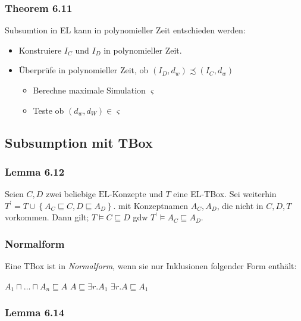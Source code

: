 \subsubsection{Theorem 6.11}\label{theorem-6.11}

Subsumtion in EL kann in polynomieller Zeit entschieden werden:

\begin{itemize}
\item
  Konstruiere $I_{C}$ und $I_{D}$ in polynomieller Zeit.
\item
  Überprüfe in polynomieller Zeit, ob
  $\left( I_{D},d_{w} \right) \precsim \left( I_{C},d_{w} \right)$

  \begin{itemize}
  \item
    Berechne maximale Simulation $\varsigma$
  \item
    Teste ob $\left( d_{w},d_{W} \right) \in \varsigma$
  \end{itemize}
\end{itemize}

\subsection{Subsumption mit TBox}\label{subsumption-mit-tbox}

\subsubsection{Lemma 6.12}\label{lemma-6.12}

Seien $C,D$ zwei beliebige $\text{EL}$-Konzepte und $T$ eine
EL-TBox. Sei weiterhin
$T^{'} = T \cup \left\{ A_{C} \sqsubseteq C,D \sqsubseteq A_{D} \right\}$.
mit Konzeptnamen $A_{C},A_{D}$, die nicht in $C,D,T$ vorkommen. Dann
gilt; $T \models C \sqsubseteq D$ gdw
$T^{'} \models A_{C} \sqsubseteq A_{D}$.

\subsubsection{ Normalform}\label{normalform}

Eine TBox ist in \emph{Normalform}, wenn sie nur Inklusionen folgender
Form enthält:

$A_1 \sqcap \ldots \sqcap A_{n} \sqsubseteq A$
$A \sqsubseteq \exists r.A_1$ $\exists r.A \sqsubseteq A_1$

\subsubsection{Lemma 6.14}\label{lemma-6.14}

